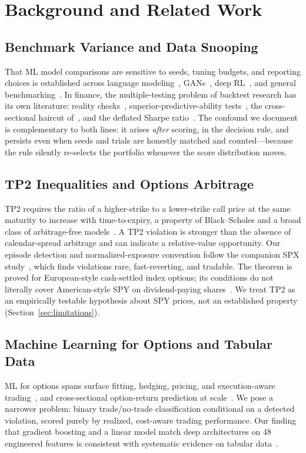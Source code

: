 \documentclass[sigconf,review,anonymous]{acmart}
\begin{document}
\section{Background and Related Work}
\label{sec:related}

\subsection{Benchmark Variance and Data Snooping}
That ML model comparisons are sensitive to seeds, tuning budgets, and reporting choices is established across language modeling~\cite{melis2018state}, GANs~\cite{lucic2018gans}, deep RL~\cite{agarwal2021deep}, and general benchmarking~\cite{bouthillier2021accounting,dodge2019show}. In finance, the multiple-testing problem of backtest research has its own literature: reality checks~\cite{white2000reality}, superior-predictive-ability tests~\cite{hansen2005spa}, the cross-sectional haircut of~\cite{harvey2016crosssection}, and the deflated Sharpe ratio~\cite{bailey2014deflated}. The confound we document is complementary to both lines: it arises \emph{after} scoring, in the decision rule, and persists even when seeds and trials are honestly matched and counted---because the rule silently re-selects the portfolio whenever the score distribution moves.

\subsection{TP2 Inequalities and Options Arbitrage}
TP2 requires the ratio of a higher-strike to a lower-strike call price at the same maturity to increase with time-to-expiry, a property of Black--Scholes and a broad class of arbitrage-free models~\cite{glasserman2026tp2theory,glasserman2023convexity}. A TP2 violation is stronger than the absence of calendar-spread arbitrage and can indicate a relative-value opportunity. Our episode detection and normalized-exposure convention follow the companion SPX study~\cite{glasserman2025tp2}, which finds violations rare, fast-reverting, and tradable. The theorem is proved for European-style cash-settled index options; its conditions do not literally cover American-style SPY on dividend-paying shares~\cite{cosma2020earlyexercise}. We treat TP2 as an empirically testable hypothesis about SPY prices, not an established property (Section~\ref{sec:limitations}).

\subsection{Machine Learning for Options and Tabular Data}
ML for options spans surface fitting, hedging, pricing, and execution-aware trading~\cite{kearns2013mlmicrostructure}, and cross-sectional option-return prediction at scale~\cite{bali2023option}. We pose a narrower problem: binary trade/no-trade classification conditional on a detected violation, scored purely by realized, cost-aware trading performance. Our finding that gradient boosting and a linear model match deep architectures on 48 engineered features is consistent with systematic evidence on tabular data~\cite{grinsztajn2022why,shwartzziv2022tabular,gorishniy2021revisiting}.
\end{document}

